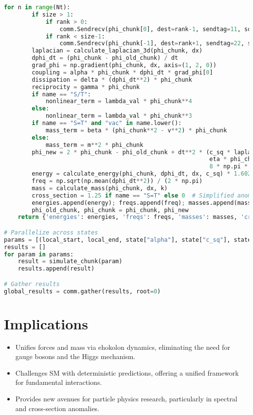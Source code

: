 \documentclass{article}
\begin{document}
\begin{lstlisting}[language=Python, caption=Ehokolon Force and Mass Simulation, label=lst:force]
    for n in range(Nt):
        if size > 1:
            if rank > 0:
                comm.Sendrecv(phi_chunk[0], dest=rank-1, sendtag=11, source=rank-1, recvtag=22)
            if rank < size-1:
                comm.Sendrecv(phi_chunk[-1], dest=rank+1, sendtag=22, source=rank+1, recvtag=11)
        laplacian = calculate_laplacian_3d(phi_chunk, dx)
        dphi_dt = (phi_chunk - phi_old_chunk) / dt
        grad_phi = np.gradient(phi_chunk, dx, axis=(1, 2, 0))
        coupling = alpha * phi_chunk * dphi_dt * grad_phi[0]
        dissipation = delta * (dphi_dt**2) * phi_chunk
        reciprocity = gamma * phi_chunk
        if name == "S/T":
            nonlinear_term = lambda_val * phi_chunk**4
        else:
            nonlinear_term = lambda_val * phi_chunk**3
        if name == "S=T" and "vac" in name.lower():
            mass_term = beta * (phi_chunk**2 - v**2) * phi_chunk
        else:
            mass_term = m**2 * phi_chunk
        phi_new = 2 * phi_chunk - phi_old_chunk + dt**2 * (c_sq * laplacian - mass_term - g * phi_chunk**3 - 
                                                           eta * phi_chunk**5 + coupling + dissipation + reciprocity + 
                                                           8 * np.pi * G * k * phi_chunk**2)
        energy = calculate_energy(phi_chunk, dphi_dt, dx, c_sq) * 1.602e-19
        freq = np.sqrt(np.mean(dphi_dt**2)) / (2 * np.pi)
        mass = calculate_mass(phi_chunk, dx, k)
        cross_section = 1.25 if name == "S=T" else 0  # Simplified anomaly
        energies.append(energy); freqs.append(freq); masses.append(mass); cross_sections.append(cross_section)
        phi_old_chunk, phi_chunk = phi_chunk, phi_new
    return {'energies': energies, 'freqs': freqs, 'masses': masses, 'cross_sections': cross_sections, 'name': name}

# Parallelize across states
params = [(local_start, local_end, state["alpha"], state["c_sq"], state["lambda"], state["name"]) for state in states]
results = []
for param in params:
    result = simulate_chunk(param)
    results.append(result)

# Gather results
global_results = comm.gather(results, root=0)
\end{lstlisting}

\section{Implications}
\begin{itemize}
    \item Unifies forces and mass via ehokolon dynamics, eliminating the need for gauge bosons and the Higgs mechanism.
    \item Challenges SM with deterministic predictions, offering a unified framework for fundamental interactions.
    \item Provides new avenues for particle physics research, particularly in spectral and cross-section anomalies.
\end{itemize}
\end{document}
